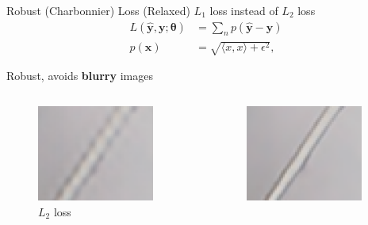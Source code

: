 \documentclass{beamer}
\begin{document}
\begin{frame}{Robust (Charbonnier) Loss}
(Relaxed) $L_1$  loss instead of $L_2$ loss
\begin{align*}
    \label{eq:charbonnier}
    L( \hat{\bm{y}}, \bm{y}; \bm{\theta}) &= \sum_n p \left( \bm{\hat{y}} - \bm{y} \right)\\
    p(\bm{x}) &= \sqrt{ \langle x, x \rangle  + \epsilon^2},
  \end{align*}

Robust, avoids \textbf{blurry} images

\begin{columns}
  \begin{column}{0.33\linewidth}
    \begin{figure}[h]
      \centering
        \includegraphics[width=0.9\textwidth]{loss_functions_lap_l2}
      \caption*{$L_2$ loss}
    \end{figure}
  \end{column}
  \begin{column}{0.33\linewidth}
    \begin{figure}[h]
      \centering
        \includegraphics[width=0.9\textwidth]{loss_functions_lap_l1}

\end{figure}
\end{column}
\end{columns}
\end{frame}
\end{document}
